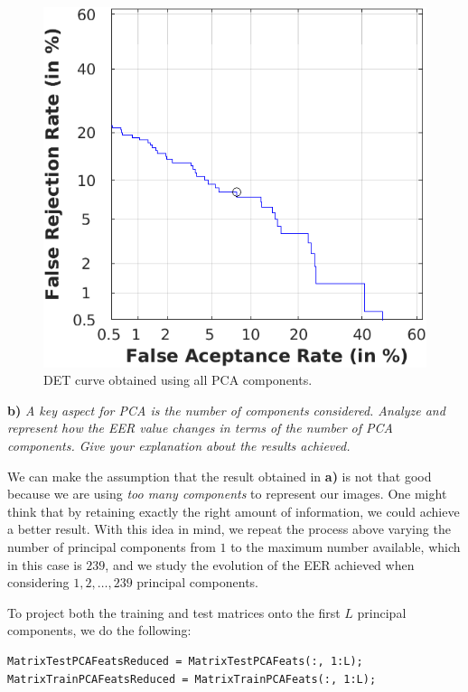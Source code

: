 \documentclass[11pt]{article}
\begin{document}
\begin{figure}[h!]
  \centering
    \includegraphics[scale=0.85]{img/2a_det}
    \caption{DET curve obtained using all PCA components.}
    \label{fig:ex2a}
\end{figure}

\textbf{b)} \emph{A key aspect for PCA is the number of components considered. Analyze and represent how the EER value changes in terms of the number of PCA components. Give your explanation about the results achieved.}

We can make the assumption that the result obtained in \textbf{a)} is not that good because we are using \textit{too many components} to represent our images. One might think that by retaining exactly the right amount of information, we could achieve a better result. With this idea in mind, we repeat the process above varying the number of principal components from $1$ to the maximum number available, which in this case is $239$, and we study the evolution of the EER achieved when considering $1,2,\dots,239$ principal components.

To project both the training and test matrices onto the first $L$ principal components, we do the following:
\begin{verbatim}
MatrixTestPCAFeatsReduced = MatrixTestPCAFeats(:, 1:L);
MatrixTrainPCAFeatsReduced = MatrixTrainPCAFeats(:, 1:L);
\end{verbatim}
\end{document}
